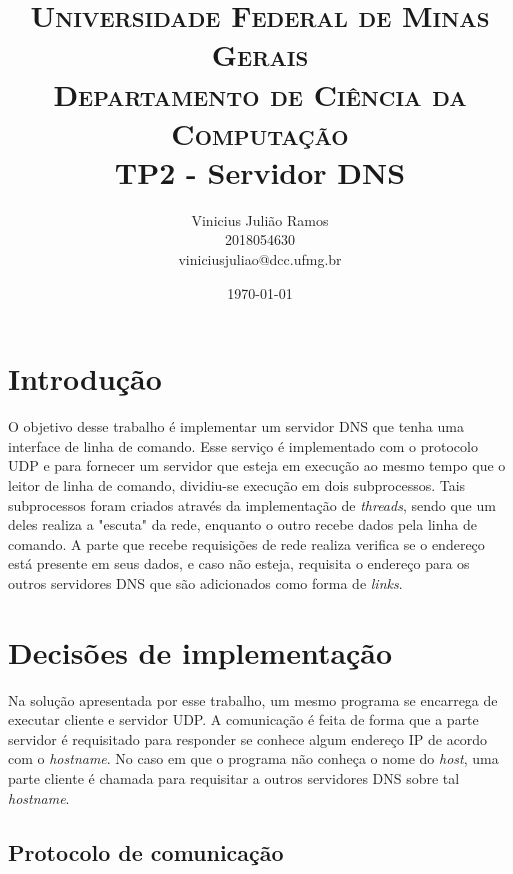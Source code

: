 \documentclass[10pt]{extarticle}
\title{ \textsc{Universidade Federal de Minas Gerais} \\
\textsc{Departamento de Ciência da Computação}\\
\bigskip TP2 - Servidor DNS}
\author{Vinicius Julião Ramos \\ 
\normalsize{2018054630} \\
\normalsize{viniciusjuliao@dcc.ufmg.br}}
\date{\today}
\begin{document}
\maketitle

\section{Introdução}

O objetivo desse trabalho é implementar um servidor DNS que tenha uma interface
de linha de comando.
Esse serviço é implementado com o protocolo UDP e para fornecer um servidor que
esteja em execução ao mesmo tempo que o leitor de linha de comando, dividiu-se
execução em dois subprocessos.
Tais subprocessos foram criados através da implementação de \textit{threads},
sendo que um deles realiza a "escuta" da rede, enquanto o outro recebe dados
pela linha de comando.
A parte que recebe requisições de rede realiza verifica se o endereço está presente
em seus dados, e caso não esteja, requisita o endereço para os outros servidores
DNS que são adicionados como forma de \textit{links}.

\section{Decisões de implementação}
Na solução apresentada por esse trabalho, um mesmo programa se encarrega de
executar cliente e servidor UDP.
A comunicação é feita de forma que a parte servidor é requisitado para responder
se conhece algum endereço IP de acordo com o \textit{hostname}.
No caso em que o programa não conheça o nome do \textit{host}, uma parte
cliente é chamada para requisitar a outros servidores DNS sobre tal
\textit{hostname}.

\subsection{Protocolo de comunicação}
\end{document}
